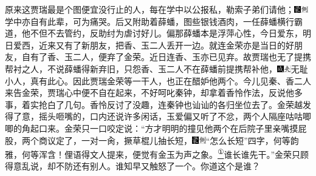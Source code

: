 原来这贾瑞最是个图便宜没行止的人，每在学中以公报私，勒索子弟们请他；{\includegraphics[width=3mm]{../Images/00006}\includegraphics[width=3mm]{../Images/00011}\footnotesize \kaishu 学中亦自有此辈，可为痛哭。}后又附助着薛蟠，图些银钱酒肉，一任薛蟠横行霸道，他不但不去管约，反助纣为虐讨好儿。偏那薛蟠本是浮萍心性，今日爱东，明日爱西，近来又有了新朋友，把香、玉二人丢开一边。就连金荣亦是当日的好朋友，自有了香、玉二人，便弃了金荣。近日连香、玉亦已见弃。故贾瑞也无了提携帮衬之人，不说薛蟠得新弃旧，只怨香、玉二人不在薛蟠前提携帮补他，{\includegraphics[width=3mm]{../Images/00005}\includegraphics[width=3mm]{../Images/00012}\footnotesize \kaishu 无耻小人，真有此心。}因此贾瑞金荣等一干人，也正在醋妒他两个。今儿见秦、香二人来告金荣，贾瑞心中便不自在起来，不好呵叱秦钟，却拿着香怜作法，反说他多事，着实抢白了几句。香怜反讨了没趣，连秦钟也讪讪的各归坐位去了。金荣越发得了意，摇头咂嘴的，口内还说许多闲话，玉爱偏又听了不忿，两个人隔座咕咕唧唧的角起口来。金荣只一口咬定说：``方才明明的撞见他两个在后院子里亲嘴摸屁股，两个商议定了，一对一肏，撅草棍儿抽长短，{\includegraphics[width=3mm]{../Images/00006}\includegraphics[width=3mm]{../Images/00011}\footnotesize \kaishu ``怎么长短''四字，何等韵雅，何等浑含！俚语得文人提来，便觉有金玉为声之象。}\href{../Text/part0013_split_000.html\#lnkback_1_a}{\textsuperscript{①}}谁长谁先干。''金荣只顾得意乱说，却不防还有别人。谁知早又触怒了一个。你道这个是谁？

